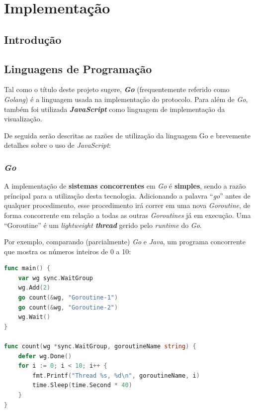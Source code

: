 %
%
%
%


\chapter{Implementação}
\label{chap:imp}

\section{Introdução}
\label{chap4:sec:intro}

\section{Linguagens de Programação}
\label{chap3:linguagens}
Tal como o título deste projeto sugere, \textbf{\emph{Go}} (frequentemente referido como \emph{Golang}) é a linguagem usada na implementação do protocolo. Para além de \emph{Go}, também foi utilizada \textbf{\emph{JavaScript}} como linguagem de implementação da visualização.

De seguida serão descritas as razões de utilização da linguagem Go e brevemente detalhes sobre o uso de \emph{JavaScript}:



\subsection{\emph{Go}}

A implementação de \textbf{sistemas concorrentes} em \emph{Go} é \textbf{simples}, sendo a razão príncipal para a utilização desta tecnologia. 
Adicionando a palavra ``\emph{go}'' antes de qualquer procedimento, esse procedimento irá correr em uma nova \emph{Goroutine}, de forma concorrente em relação a todas as outras \emph{Goroutines} já em execução.
Uma ``Goroutine'' é um \emph{lightweight \textbf{thread}} gerido pelo \emph{runtime} do \emph{Go}.




Por exemplo, comparando (parcialmente) \emph{Go} e \emph{Java}, um programa concorrente que mostra os números inteiros de 0 a 10:
\begin{lstlisting}[caption={Exemplo em \emph{Go}, usando a \emph{keyword} ``go'' para começar uma \emph{Goroutine}.},language=Go]
func main() {
	var wg sync.WaitGroup
	wg.Add(2)
	go count(&wg, "Goroutine-1")
	go count(&wg, "Goroutine-2")
	wg.Wait()
}

func count(wg *sync.WaitGroup, goroutineName string) {
	defer wg.Done()
	for i := 0; i < 10; i++ {
		fmt.Printf("Thread %s, %d\n", goroutineName, i)
		time.Sleep(time.Second * 40)
	}
}
\end{lstlisting}

